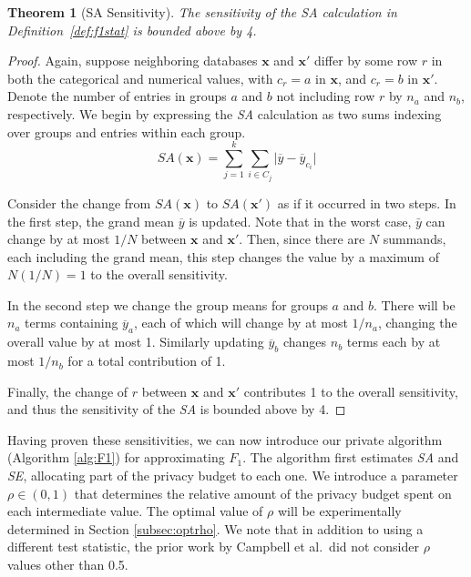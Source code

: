 \documentclass[USenglish,oneside]{article}
\newcounter{ab}
\newcounter{ar}
\newcounter{igh}
\newcounter{ms}
\newtheorem{theorem}{Theorem}
\newcommand{\dbsize}{\ensuremath{N}\xspace}
\newcommand{\se}{\textit{SE}\xspace}
\newcommand{\sa}{\textit{SA}\xspace}
\newcommand{\x}{\ensuremath{\mathbf{x}}\xspace}
\newcommand{\xprime}{\ensuremath{\mathbf{x'}}\xspace}
\begin{document}
\begin{theorem}[SA Sensitivity] \label{thm:SAsens}
The sensitivity of the SA calculation in Definition~\ref{def:f1stat} is bounded above by 4. 
\end{theorem}

\begin{proof}
Again, suppose neighboring databases \x and \xprime differ by some row $r$ in both the categorical and numerical values, with $c_r = a$ in \x, and $c_r = b$ in \xprime. Denote the number of entries in groups $a$ and $b$ not including row $r$ by $n_a$ and $n_b$, respectively. We begin by expressing the \sa calculation as two sums indexing over groups and entries within each group.
$$
\sa(\x)  = \sum_{j = 1}^{k}\sum_{i \in C_j} \lvert \overline{y} - \overline{y}_{c_i} \rvert
$$

Consider the change from $\sa(\x)$ to $\sa(\xprime)$ as if it occurred in two steps.  In the first step, the grand mean $\overline{y}$ is updated.  Note that in the worst case, $\bar{y}$ can change by at most $1/\dbsize$ between \x and \xprime. Then, since there are $N$ summands, each including the grand mean, this step changes the value by a maximum of $N(1/N)=1$ to the overall sensitivity. 

In the second step we change the group means for groups $a$ and $b$.  There will be $n_a$ terms containing $\overline{y}_a$, each of which will change by at most $1/n_a$, changing the overall value by at most 1.  Similarly updating $\overline{y}_b$ changes $n_b$ terms each by at most $1/n_b$ for a total contribution of 1.  

Finally, the change of $r$ between \x and \xprime contributes 1 to the overall sensitivity, and thus the sensitivity of the \sa is bounded above by 4.

\end{proof}


Having proven these sensitivities, we can now introduce our private algorithm (Algorithm \ref{alg:F1}) for approximating $F_1$.  The algorithm first estimates \sa and \se, allocating part of the privacy budget to each one. We introduce a parameter $\rho \in (0,1)$ that determines the relative amount of the privacy budget spent on each intermediate value.  The optimal value of $\rho$ will be experimentally determined in Section \ref{subsec:optrho}.  We note that in addition to using a different test statistic, the prior work by Campbell et al.~did not consider $\rho$ values other than 0.5.
\end{document}
